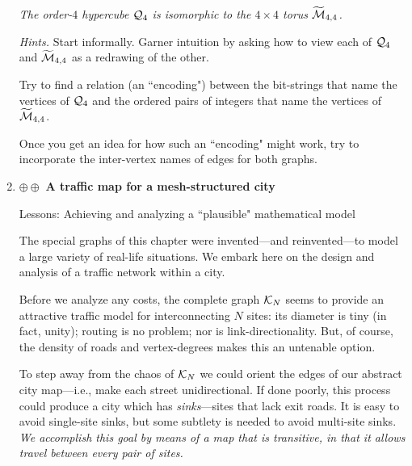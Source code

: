 \begin{enumerate}
{\em The order-$4$ hypercube $\mbox{$\cal Q$}_4$ is \textit{isomorphic} to the $4 \times 4$ torus $\widetilde{\mbox{$\cal M$}}_{4,4}$.}

\medskip

{\it Hints.}
Start informally.  Garner intuition by asking how to view each of $\mbox{$\cal Q$}_4$ and $\widetilde{\mbox{$\cal M$}}_{4,4}$ as a redrawing of the other.

\smallskip

Try to find a relation (an ``encoding") between the bit-strings that name the vertices of $\mbox{$\cal Q$}_4$ and the ordered pairs of integers that name the vertices of $\widetilde{\mbox{$\cal M$}}_{4,4}$.

\smallskip 

Once you get an idea for how such an ``encoding" might work, try to incorporate the inter-vertex names of edges for both graphs.

\medskip\item
$\oplus \oplus$
{\bf A traffic map for a mesh-structured city}

{\sc Lessons:} Achieving and analyzing a ``plausible" mathematical model

\smallskip

The special graphs of this chapter were invented---and reinvented---to model a large variety of real-life situations.  We embark here on the design and analysis of a traffic network within a city.

\smallskip

Before we analyze any costs, the complete graph $\mbox{$\cal K$}_N$ seems to provide an attractive traffic model for interconnecting $N$ sites: its diameter is tiny (in fact, unity); routing is no problem; nor is link-directionality.  But, of course, the density of roads and vertex-degrees makes this an untenable option.

\smallskip

To step away from the chaos of $\mbox{$\cal K$}_N$ we could orient the edges of our abstract city map---i.e., make each street unidirectional.  If done poorly, this process could produce a city which has {\em sinks}---sites that lack exit roads.  It is easy to avoid single-site sinks, but some subtlety is needed to avoid multi-site sinks.
{\em We accomplish this goal by means of a map that is {\em transitive}, in that it allows travel between every pair of sites.}

 


\end{enumerate}
